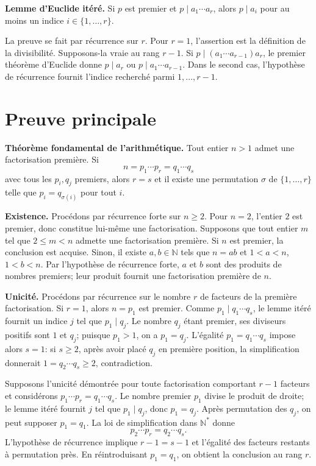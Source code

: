 \documentclass[11pt,a4paper]{article}
\newcommand{\N}{\mathbb{N}}
\begin{document}
\begin{lemmabox}
\textbf{Lemme d'Euclide it\'er\'e.}
Si $p$ est premier et $p\mid a_1\cdots a_r$, alors $p\mid a_i$ pour au moins
un indice $i\in\{1,\ldots,r\}$.
\end{lemmabox}
\begin{proofbox}
La preuve se fait par r\'ecurrence sur $r$. Pour $r=1$, l'assertion est la
d\'efinition de la divisibilit\'e. Supposons-la vraie au rang $r-1$. Si
$p\mid(a_1\cdots a_{r-1})a_r$, le premier th\'eor\`eme d'Euclide donne
$p\mid a_r$ ou $p\mid a_1\cdots a_{r-1}$. Dans le second cas, l'hypoth\`ese de
r\'ecurrence fournit l'indice recherch\'e parmi $1,\ldots,r-1$.
\end{proofbox}

\section{Preuve principale}
\begin{theorembox}
\textbf{Th\'eor\`eme fondamental de l'arithm\'etique.}
Tout entier $n>1$ admet une factorisation premi\`ere. Si
\[
 n=p_1\cdots p_r=q_1\cdots q_s
\]
avec tous les $p_i,q_j$ premiers, alors $r=s$ et il existe une permutation
$\sigma$ de $\{1,\ldots,r\}$ telle que $p_i=q_{\sigma(i)}$ pour tout $i$.
\end{theorembox}
\begin{proofbox}
\textbf{Existence.} Proc\'edons par r\'ecurrence forte sur $n\geq2$. Pour $n=2$,
l'entier $2$ est premier, donc constitue lui-m\^eme une factorisation. Supposons
que tout entier $m$ tel que $2\leq m<n$ admette une factorisation premi\`ere.
Si $n$ est premier, la conclusion est acquise. Sinon, il existe $a,b\in\N$ tels
que $n=ab$ et $1<a<n$, $1<b<n$. Par l'hypoth\`ese de r\'ecurrence forte,
$a$ et $b$ sont des produits de nombres premiers; leur produit fournit une
factorisation premi\`ere de $n$.

\medskip
\textbf{Unicit\'e.} Proc\'edons par r\'ecurrence sur le nombre $r$ de facteurs
de la premi\`ere factorisation. Si $r=1$, alors $n=p_1$ est premier. Comme
$p_1\mid q_1\cdots q_s$, le lemme it\'er\'e fournit un indice $j$ tel que
$p_1\mid q_j$. Le nombre $q_j$ \'etant premier, ses diviseurs positifs sont
$1$ et $q_j$; puisque $p_1>1$, on a $p_1=q_j$. L'\'egalit\'e
$p_1=q_1\cdots q_s$ impose alors $s=1$: si $s\geq2$, apr\`es avoir plac\'e
$q_j$ en premi\`ere position, la simplification donnerait
$1=q_2\cdots q_s\geq2$, contradiction.

Supposons l'unicit\'e d\'emontr\'ee pour toute factorisation comportant $r-1$
facteurs et consid\'erons
$p_1\cdots p_r=q_1\cdots q_s$. Le nombre premier $p_1$ divise le produit de
droite; le lemme it\'er\'e fournit $j$ tel que $p_1\mid q_j$, donc $p_1=q_j$.
Apr\`es permutation des $q_j$, on peut supposer $p_1=q_1$. La loi de
simplification dans $\N^*$ donne
\[
 p_2\cdots p_r=q_2\cdots q_s.
\]
L'hypoth\`ese de r\'ecurrence implique $r-1=s-1$ et l'\'egalit\'e des facteurs
restants \`a permutation pr\`es. En r\'eintroduisant $p_1=q_1$, on obtient la
conclusion au rang $r$.
\end{proofbox}
\end{document}
